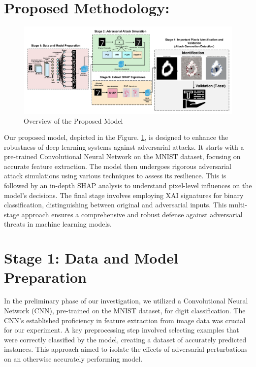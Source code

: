 \documentclass[10pt, conference, a4paper, final]{IEEEtran}
\begin{document}
\section{Proposed Methodology:}

\begin{figure}[!ht]
    \centering
    \includegraphics[width=1\textwidth]{paper_images/papermodel_v2.pdf}
    \caption{Overview of the Proposed Model}
    \label{overview}
\end{figure}
   
Our proposed model, depicted in the Figure. \ref{overview}, is designed to enhance the robustness of deep learning systems against adversarial attacks. It starts with a pre-trained Convolutional Neural Network on the MNIST dataset, focusing on accurate feature extraction. The model then undergoes rigorous adversarial attack simulations using various techniques to assess its resilience. This is followed by an in-depth SHAP analysis to understand pixel-level influences on the model's decisions. The final stage involves employing XAI signatures for binary classification, distinguishing between original and adversarial inputs. This multi-stage approach ensures a comprehensive and robust defense against adversarial threats in machine learning models.

\section{Stage 1: Data and Model Preparation}
In the preliminary phase of our investigation, we utilized a Convolutional Neural Network (CNN), pre-trained on the MNIST dataset, for digit classification. The CNN's established proficiency in feature extraction from image data was crucial for our experiment. A key preprocessing step involved selecting examples that were correctly classified by the model, creating a dataset of accurately predicted instances. This approach aimed to isolate the effects of adversarial perturbations on an otherwise accurately performing model.
\end{document}

